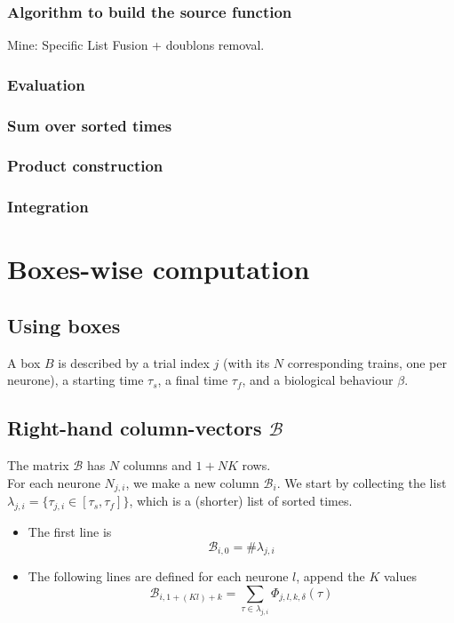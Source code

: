 \documentclass{revtex4}
\begin{document}
\subsubsection{Algorithm to build the source function}
Mine: Specific List Fusion + doublons removal.

\subsubsection{Evaluation}

\subsubsection{Sum over sorted times}

\subsubsection{Product construction}

\subsubsection{Integration}


\section{Boxes-wise computation}
\subsection{Using boxes}
A box $B$ is described by a trial index $j$ (with its $N$ corresponding trains, one per neurone),
a starting time $\tau_{s}$, a final time $\tau_{f}$, and a biological behaviour $\beta$.

\subsection{Right-hand column-vectors $\mathcal{B}$}
The matrix $\mathcal{B}$ has $N$ columns and $1+NK$ rows.\\
For each neurone $N_{j,i}$, we make a new column $\mathcal{B}_i$.
We start by collecting the list $\lambda_{j,i}=\lbrace\tau_{j,i}\in\left[\tau_s,\tau_f\right]\rbrace$,
which is a (shorter) list of sorted times.
\begin{itemize}
\item
The first line is
$$
	\mathcal{B}_{i,0} = \#\lambda_{j,i}
$$
\item
The following lines are defined for each neurone $l$, append the $K$ values
$$
	\mathcal{B}_{i,1+(Kl)+k} = \sum_{\tau\in\lambda_{j,i}} \Phi_{j,l,k,\delta}(\tau)
$$
\end{itemize}
\end{document}
